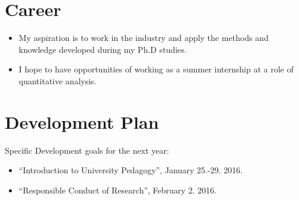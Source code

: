 \documentclass{article}
\begin{document}
\section{Career}
\begin{itemize}
\item My aspiration is to work in the industry and apply the methods
  and knowledge developed during my Ph.D studies.
\item I hope to have opportunities of working as a summer internship
  at a role of quantitative analysis.
\end{itemize}

\section{Development Plan}
Specific Development goals for the next year:
\begin{itemize}
\item ``Introduction to University Pedagogy'', January 25.-29. 2016.
\item ``Responsible Conduct of Research'', February 2. 2016.
\end{itemize}



\end{document}
